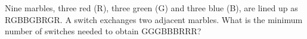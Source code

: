Nine marbles, three red (R), three green (G) and three blue (B), are lined up as RGBBGBRGR. A switch exchanges two adjacent marbles. What is the minimum number of switches needed to obtain GGGBBBRRR?
